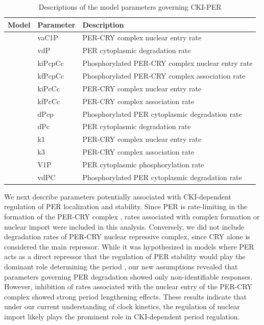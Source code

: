 \begin{table}[p]
\caption{Descriptions of the model parameters governing CKI-PER}
\label{tab:4.2}
\centering
\begin{tabular}{llp{10cm}}\toprule
Model              & Parameter & Description \\\midrule
\cite{Hirota2012}  & vaC1P   & PER-CRY complex nuclear entry rate \\
                   & vdP     & PER cytoplasmic degradation rate \\\midrule
\cite{Relogio2011} & kiPcpCc & Phosphorylated PER-CRY complex nuclear entry rate \\
                   & kfPcpCc & Phosphorylated PER-CRY complex association rate \\
                   & kiPcCc  & PER-CRY complex nuclear entry rate \\
                   & kfPcCc  & PER-CRY complex association rate \\
                   & dPcp    & Phosphorylated PER cytoplasmic degradation rate \\
                   & dPc     & PER cytoplasmic degradation rate \\\midrule
\cite{Leloup2003}  & k1      & PER-CRY complex nuclear entry rate \\
                   & k3      & PER-CRY complex association rate \\
                   & V1P     & PER cytoplasmic phosphorylation rate \\
                   & vdPC    & Phosphorylated PER cytoplasmic degradation rate \\\bottomrule
\end{tabular}
\end{table}

We next describe parameters potentially associated with CKI-dependent regulation of PER localization and stability. 
Since PER is rate-limiting in the formation of the PER-CRY complex \cite{Lee2001}, rates associated with complex formation or nuclear import were included in this analysis. 
Conversely, we did not include degradation rates of PER-CRY nuclear repressive complex, since CRY alone is considered the main repressor. 
While it was hypothesized in models where PER acts as a direct repressor that the regulation of PER stability would play the dominant role determining the period \cite{Gallego2006, Vanselow2006}, our new assumptions revealed that parameters governing PER degradation showed only non-identifiable responses. 
 However, inhibition of rates associated with the nuclear entry of the PER-CRY complex showed strong period lengthening effects. 
These results indicate that under our current understanding of clock kinetics, the regulation of nuclear import likely plays the prominent role in CKI-dependent period regulation.

